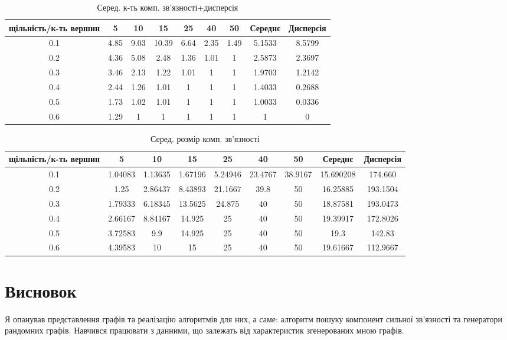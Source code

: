 \documentclass{article}
\begin{document}
\begin{table}
  \centering
  \caption{Серед. к-ть комп. зв'язності+дисперсія}
\begin{tabular}{|c|c|c|c|c|c|c|c|c|}
    \hline
    щільність/к-ть вершин & 5 & 10 & 15 & 25 & 40 & 50 & Середнє & Дисперсія \\
    \hline
    0.1 & 4.85 & 9.03 & 10.39 & 6.64 & 2.35 & 1.49 & 5.1533 & 8.5799 \\
    \hline
    0.2 & 4.36 & 5.08 & 2.48 & 1.36 & 1.01 & 1 & 2.5873 & 2.3697 \\
    \hline
    0.3 & 3.46 & 2.13 & 1.22 & 1.01 & 1 & 1 & 1.9703 & 1.2142 \\
    \hline
    0.4 & 2.44 & 1.26 & 1.01 & 1 & 1 & 1 & 1.4033 & 0.2688 \\
    \hline
    0.5 & 1.73 & 1.02 & 1.01 & 1 & 1 & 1 & 1.0033 & 0.0336 \\
    \hline
    0.6 & 1.29 & 1 & 1 & 1 & 1 & 1 & 1 & 0 \\
    \hline
  \end{tabular}
\end{table}

\begin{table}
  \centering
  \caption{Серед. розмір комп. зв'язності}
  \begin{tabular}{|c|c|c|c|c|c|c|c|c|}
    \hline
    щільність/к-ть вершин & 5 & 10 & 15 & 25 & 40 & 50 & Середнє & Дисперсія \\
    \hline
    0.1 & 1.04083 & 1.13635 & 1.67196 & 5.24946 & 23.4767 & 38.9167 & 15.690208 & 174.660 \\
    \hline
    0.2 & 1.25 & 2.86437 & 8.43893 & 21.1667 & 39.8 & 50 & 16.25885 & 193.1504 \\
    \hline
    0.3 & 1.79333 & 6.18345 & 13.5625 & 24.875 & 40 & 50 & 18.87581 & 193.0473 \\
    \hline
    0.4 & 2.66167 & 8.84167 & 14.925 & 25 & 40 & 50 & 19.39917 & 172.8026 \\
    \hline
    0.5 & 3.72583 & 9.9 & 14.925 & 25 & 40 & 50 & 19.3 & 142.83 \\
    \hline
    0.6 & 4.39583 & 10 & 15 & 25 & 40 & 50 & 19.61667 & 112.9667 \\
    \hline
  \end{tabular}
\end{table}

\section{Висновок}
Я опанував представлення графів та реалізацію алгоритмів для них, а саме: алгоритм пошуку компонент сильної зв'язності та генератори рандомних графів. Навчився працювати з данними, що залежать від характеристик згенерованих мною графів. 
\end{document}
